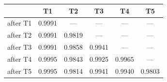 \begin{tabular}{@{}lccccc@{}}
\toprule
& \textbf{T1} & \textbf{T2} & \textbf{T3} & \textbf{T4} & \textbf{T5} \\
\midrule
after T1 & 0.9991 & --- & --- & --- & --- \\
after T2 & 0.9991 & 0.9819 & --- & --- & --- \\
after T3 & 0.9991 & 0.9858 & 0.9941 & --- & --- \\
after T4 & 0.9995 & 0.9843 & 0.9925 & 0.9965 & --- \\
after T5 & 0.9995 & 0.9814 & 0.9941 & 0.9940 & 0.9803 \\
\bottomrule
\end{tabular}
